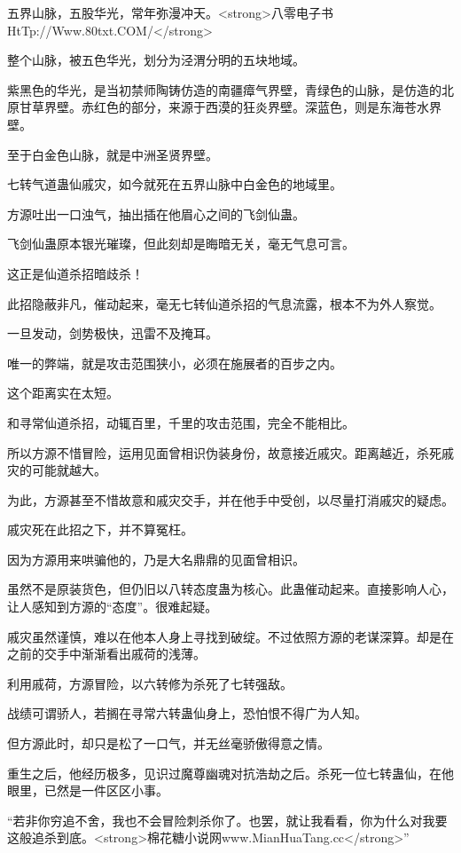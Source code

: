 
\begin{this_body}

五界山脉，五股华光，常年弥漫冲天。<strong>八零电子书HtTp://Www.80txt.COM/</strong>

整个山脉，被五色华光，划分为泾渭分明的五块地域。

紫黑色的华光，是当初禁师陶铸仿造的南疆瘴气界壁，青绿色的山脉，是仿造的北原甘草界壁。赤红色的部分，来源于西漠的狂炎界壁。深蓝色，则是东海苍水界壁。

至于白金色山脉，就是中洲圣贤界壁。

七转气道蛊仙戚灾，如今就死在五界山脉中白金色的地域里。

方源吐出一口浊气，抽出插在他眉心之间的飞剑仙蛊。

飞剑仙蛊原本银光璀璨，但此刻却是晦暗无关，毫无气息可言。

这正是仙道杀招暗歧杀！

此招隐蔽非凡，催动起来，毫无七转仙道杀招的气息流露，根本不为外人察觉。

一旦发动，剑势极快，迅雷不及掩耳。

唯一的弊端，就是攻击范围狭小，必须在施展者的百步之内。

这个距离实在太短。

和寻常仙道杀招，动辄百里，千里的攻击范围，完全不能相比。

所以方源不惜冒险，运用见面曾相识伪装身份，故意接近戚灾。距离越近，杀死戚灾的可能就越大。

为此，方源甚至不惜故意和戚灾交手，并在他手中受创，以尽量打消戚灾的疑虑。

戚灾死在此招之下，并不算冤枉。

因为方源用来哄骗他的，乃是大名鼎鼎的见面曾相识。

虽然不是原装货色，但仍旧以八转态度蛊为核心。此蛊催动起来。直接影响人心，让人感知到方源的“态度”。很难起疑。

戚灾虽然谨慎，难以在他本人身上寻找到破绽。不过依照方源的老谋深算。却是在之前的交手中渐渐看出戚荷的浅薄。

利用戚荷，方源冒险，以六转修为杀死了七转强敌。

战绩可谓骄人，若搁在寻常六转蛊仙身上，恐怕恨不得广为人知。

但方源此时，却只是松了一口气，并无丝毫骄傲得意之情。

重生之后，他经历极多，见识过魔尊幽魂对抗浩劫之后。杀死一位七转蛊仙，在他眼里，已然是一件区区小事。

“若非你穷追不舍，我也不会冒险刺杀你了。也罢，就让我看看，你为什么对我要这般追杀到底。<strong>棉花糖小说网www.MianHuaTang.cc</strong>”


\end{this_body}
